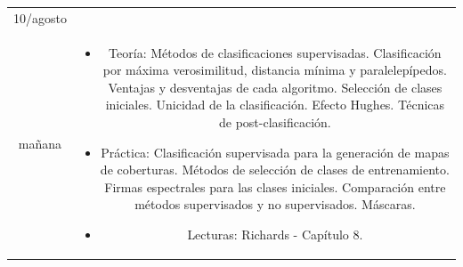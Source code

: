 \documentclass[11pt]{article}
\begin{document}
\begin{longtable}[h!]{ c  c  }
\midrule
10/agosto \\ ma\~nana & \begin{minipage}{.65\textwidth}
\begin{itemize}
    \vspace{1mm}
	\item Teoría: Métodos de clasificaciones supervisadas. Clasificación por máxima verosimilitud, distancia mínima y paralelepípedos. Ventajas y desventajas de cada algoritmo. Selección de clases iniciales. Unicidad de la clasificación. Efecto Hughes. Técnicas de post-clasificación.
	\item Práctica: Clasificación supervisada para la generación de mapas de coberturas. Métodos de selección de clases de entrenamiento. Firmas espectrales para las clases iniciales. Comparación entre métodos supervisados y no supervisados. Máscaras.
	\item Lecturas: Richards - Capítulo 8.
    \vspace{1mm}
\end{itemize}
\end{minipage} \\


\end{longtable}
\end{document}
